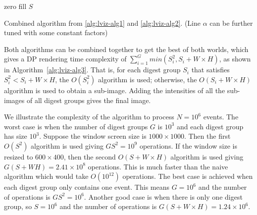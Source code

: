 \begin{algorithm}[htb]
\BlankLine
zero fill $S$\;
\caption{Combined algorithm from \ref{alg:lviz-alg1} and \ref{alg:lviz-alg2}.
(Line $\alpha$ can be further tuned with some constant factors)}
\label{alg:lviz-alg3}
\end{algorithm}

Both algorithms can be combined together to
get the best of both worlds, which gives
a DP rendering time complexity of $\sum_{i=1}^{G} min(S_i^2, S_i + W\times H)$,
as shown in Algorithm~\ref{alg:lviz-alg3}.
That is, for each digest group $S_i$ that satisfies $S_i^2 < S_i+W\times H$, 
the $O(S_i^2)$ algorithm is used;
otherwise, the $O(S_i + W\times H)$ algorithm is used to obtain a sub-image.
Adding the intensities of all the sub-images of all digest groups gives the final image.

We illustrate the complexity of the algorithm to process $N=10^6$ events.
The worst case is when the number of digest groups $G$ is $10^3$
and each digest group has size $10^3$.
Suppose the window screen size is $1000\times 1000$.
Then the first $O(S^2)$ algorithm is used giving $GS^2 = 10^9$ operations.
If the window size is resized to $600\times 400$, then
the second $O(S+W\times H)$ algorithm is used giving $G(S+WH)=2.41\times 10^8$ operations.
This is much faster than the naive algorithm which would take $O(10^{12})$
operations.
The best case is achieved when each digest group only contains one event.
This means $G = 10^6$ and the number of operations
is $G S^2=10^6$.
Another good case is when there is only one digest group,
so $S=10^6$ and the number of operations is $G(S + W\times H)=1.24\times10^6$.

